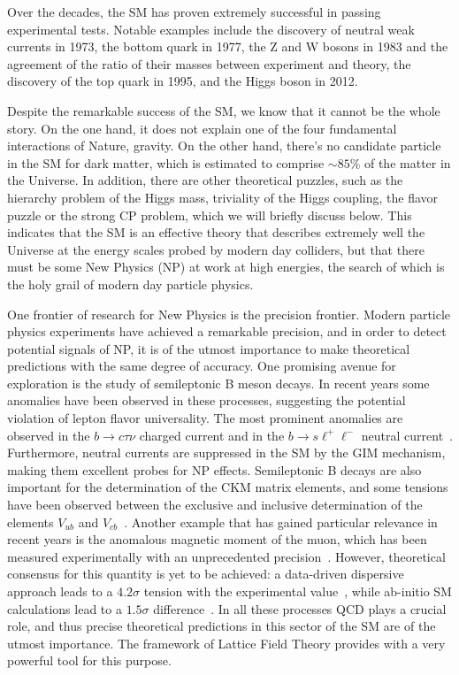 Over the decades, the SM has proven extremely successful in passing experimental tests. Notable examples include the discovery of neutral weak currents in 1973, the bottom quark in 1977, the Z and W bosons in 1983 and the agreement of the ratio of their masses between experiment and theory, the discovery of the top quark in 1995, and the Higgs boson in 2012. 

Despite the remarkable success of the SM, we know that it cannot be the whole story. On the one hand, it does not explain one of the four fundamental interactions of Nature, gravity. On the other hand, there's no candidate particle in the SM for dark matter, which is estimated to comprise $\sim85\%$ of the matter in the Universe. In addition, there are other theoretical puzzles, such as the hierarchy problem of the Higgs mass, triviality of the Higgs coupling, the flavor puzzle or the strong CP problem, which we will briefly discuss below. This indicates that the SM is an effective theory that describes extremely well the Universe at the energy scales probed by modern day colliders, but that there must be some New Physics (NP) at work at high energies, the search of which is the holy grail of modern day particle physics. 

One frontier of research for New Physics is the precision frontier. Modern particle physics experiments have achieved a remarkable precision, and in order to detect potential signals of NP, it is of the utmost importance to make theoretical predictions with the same degree of accuracy. One promising avenue for exploration is the study of semileptonic B meson decays. In recent years some anomalies have been observed in these processes, suggesting the potential violation of lepton flavor universality. The most prominent anomalies are observed in the $b\to c\tau\nu$ charged current and in the $b\to s\ell^+\ell^-$ neutral current~\citep{Capdevila:2023yhq}. Furthermore, neutral currents are suppressed in the SM by the GIM mechanism, making them excellent probes for NP effects. Semileptonic B decays are also important for the determination of the CKM matrix elements, and some tensions have been observed between the exclusive and inclusive determination of the elements $V_{ub}$ and $V_{cb}$~\citep{Ricciardi:2019zph}. Another example that has gained particular relevance in recent years is the anomalous magnetic moment of the muon, which has been measured experimentally with an unprecedented precision~\citep{Muong-2:2006rrc}. However, theoretical consensus for this quantity is yet to be achieved: a data-driven dispersive approach leads to a $4.2\sigma$ tension with the experimental value~\citep{Aoyama:2020ynm}, while ab-initio SM calculations lead to a $1.5\sigma$ difference~\citep{Borsanyi:2020mff}. In all these processes QCD plays a crucial role, and thus precise theoretical predictions in this sector of the SM are of the utmost importance. The framework of Lattice Field Theory provides with a very powerful tool for this purpose.

